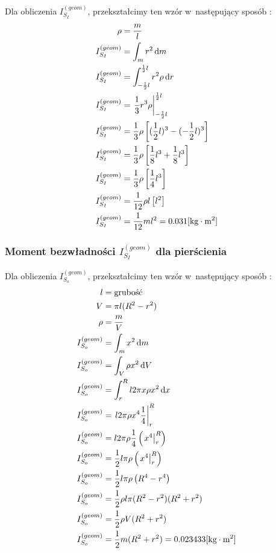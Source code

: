 \documentclass{fizraport}
\begin{document}
Dla obliczenia $I_{S_I}^{(geom)}$, przekształcimy ten wzór w~następujący sposób :
\begin{align*}%
    \rho&=\dfrac{m}{l}\\%
    I_{S_I}^{(geom)} &= \int_m{r^2 \di m}\\
    I_{S_I}^{(geom)} &= \int_{-\frac{1}{2}l}^{\frac{1}{2}l}{r^2\rho \di r}\\
    I_{S_I}^{(geom)} &= \Eval{\frac{1}{3}r^3\rho }{-\frac{1}{2}l}{\frac{1}{2}l}\\
    I_{S_I}^{(geom)} &= \frac{1}{3}\rho\left[ (\frac{1}{2}l)^3-(-\frac{1}{2}l)^3 \right]\\
    I_{S_I}^{(geom)} &= \frac{1}{3}\rho\left[ \frac{1}{8}l^3 + \frac{1}{8}l^3 \right]\\
    I_{S_I}^{(geom)} &= \frac{1}{3}\rho\left[ \frac{1}{4}l^3 \right]\\
    I_{S_I}^{(geom)} &= \frac{1}{12}\rho l\left[l^2 \right]\\
    I_{S_I}^{(geom)} &= \frac{1}{12}ml^2=0.031[\text{kg}\cdot\text{m}^2]
\end{align*}    
\newpage
\subsubsection{Moment bezwładności $I_{S_I}^{(geom)}$ dla pierścienia}
Dla obliczenia $I_{S_o}^{(geom)}$, przekształcimy ten wzór w~następujący sposób :
\begin{align*}%
                   l &= \text{grubość}\\
                   V &=\pi l(R^2-r^2)\\
                \rho &=\frac{m}{V}\\
    I_{S_o}^{(geom)} &= \int_m{x^2 \di m}\\
    I_{S_o}^{(geom)} &= \int_V{\rho x^2 \di V}\\
    I_{S_o}^{(geom)} &= \int_r^R{l 2\pi x \rho x^2 \di x}\\
    I_{S_o}^{(geom)} &= \Eval{l 2\pi\rho x^4\frac{1}{4}}{r}{R}\\
    I_{S_o}^{(geom)} &= l 2\pi\rho\frac{1}{4} \left(\Eval{x^4}{r}{R}\right)\\
    I_{S_o}^{(geom)} &= \frac{1}{2}l\pi\rho \left(\Eval{x^4}{r}{R}\right)\\
    I_{S_o}^{(geom)} &= \frac{1}{2}l\pi\rho \left(R^4-r^4\right)\\
    I_{S_o}^{(geom)} &= \frac{1}{2}\rho l\pi(R^2-r^2)(R^2+r^2)\\
    I_{S_o}^{(geom)} &= \frac{1}{2}\rho V(R^2+r^2)\\
    I_{S_o}^{(geom)} &= \frac{1}{2}m(R^2+r^2)=0.023433[\text{kg}\cdot\text{m}^2]
\end{align*}
\end{document}
